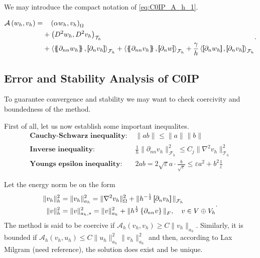 We may introduce the compact notation of \eqref{eq:C0IP_A_h_1}.

\begin{equation}
\label{eq:C0IP_A_h}
\begin{split}
\mathcal{A} \left( w_{h}, v_{h} \right)   =&
  \quad  \left( \alpha  w_{h}, v_{h} \right) _{\Omega }\\
&  +  \left( D^2 w_{h}, D^2v_{h} \right) _{\mathcal{T} _{h}} \\
 & +
  \left< \mean{  \partial _{n n} w_{h} }, \jump{ \partial _{n }v_{h}} \right>_{\mathcal{F}_{h}}  +
 \left< \mean{ \partial _{n n} v_{h} }, \jump{ \partial _{n}w }      \right>_{\mathcal{F}_{h}}
+ \frac{\gamma }{h}  \left< \jump{ \partial _{n} w_{h}}, \jump{ \partial _{n} v_{h}   }   \right>_{\mathcal{F}_{h}}
\end{split}
.\end{equation}

\subsection{Error and Stability Analysis of C0IP}%
\label{sub:error_and_stability_analysis_of_c0ip}

To guarantee convergence and stability we may want to check coercivity and boundedness of the method.

First of all, let us now establish some important inequalites.
\[
\begin{split}
    \textbf{Cauchy-Schwarz inequality: } & \| ab \|_{  }^{  }  \le \| a \|_{  }^{  } \| b \|_{  }^{  }   \\
    \textbf{Inverse inequality: } & \frac{1}{h}\| \partial _{nn}  v_{h} \|_{\mathcal{F}_{h}   }^{2  }  \le C_{j} \| \nabla ^2 v_{h} \|_{ \mathcal{T} _{h} }^{ 2 }   \\
    \textbf{Youngs epsilon inequality: } & 2ab =   2\sqrt{\varepsilon }a\cdot    \frac{b}{\sqrt{\varepsilon } } \le \varepsilon a^2+ b^2 \frac{1}{\varepsilon }
\end{split}
\]

Let the energy norm be on the form
\begin{equation}
\label{eq:A_energy_norm}
    \begin{split}
\| v_{h} \|_{ h }^{2  } & = \| v_{h} \|_{ a_{h} }^{ 2 } = \| \nabla ^2 v_{h} \|_{ \Omega  }^{ 2 }  + \|  h^{-\frac{1}{2}} \left[\!\!\left[  \partial _{n} v_{h}     \right]\!\!\right]\|_{  \mathcal{F} _{h} }^{  } \\
\| v \|_{ h }^{ 2 }  &= \| v \|_{ a_{h},* }^{ 2 } = \| v \|_{ a_{h} }^{ 2 }  + \| h^{\frac{1}{2}} \left\{ \partial _{nn } v\right\}  \|_{ F  }^{  }, \quad  v\in V \oplus V_{h}
    \end{split}
.\end{equation}
The method is said to be coercive if $\mathcal{A} _{h}\left( v_{h}, v_{h} \right) \ge  C \| v_{h} \|_{ a_{h} }^{  } $. Similarly, it is bounded if $ \mathcal{A} _{h} \left( v_{h}, u_{h} \right) \le  C \| u_{h} \|_{  a_{h}}^{ 2 }  \| v_{h} \|_{ a_{h}
}^{ 2 } $ and then, according to Lax Milgram (need reference), the solution does exist and be unique.

